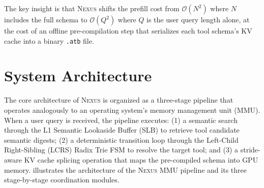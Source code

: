 \documentclass[conference,10pt]{IEEEtran}
\newcommand{\Nexus}{\textsc{Nexus}\xspace}
\newcommand{\atb}{\texttt{.atb}\xspace}
\begin{document}
The key insight is that \Nexus shifts the prefill cost from $\mathcal{O}(N^2)$ where
$N$ includes the full schema to $\mathcal{O}(Q^2)$ where $Q$ is the user query
length alone, at the cost of an offline pre-compilation step that serializes
each tool schema's KV cache into a binary \atb file.

\section{System Architecture}
\label{sec:architecture}

The core architecture of \Nexus is organized as a three-stage pipeline that operates
analogously to an operating system's memory management unit (MMU). When a user query
is received, the pipeline executes: (1) a semantic search through the L1 Semantic
Lookaside Buffer (SLB) to retrieve tool candidate semantic digests; (2) a deterministic transition
loop through the Left-Child Right-Sibling (LCRS) Radix Trie FSM to resolve the target tool;
and (3) a stride-aware KV cache splicing operation that maps the pre-compiled schema into GPU memory.  illustrates the architecture of the \Nexus MMU pipeline and its three stage-by-stage coordination modules.
\end{document}
